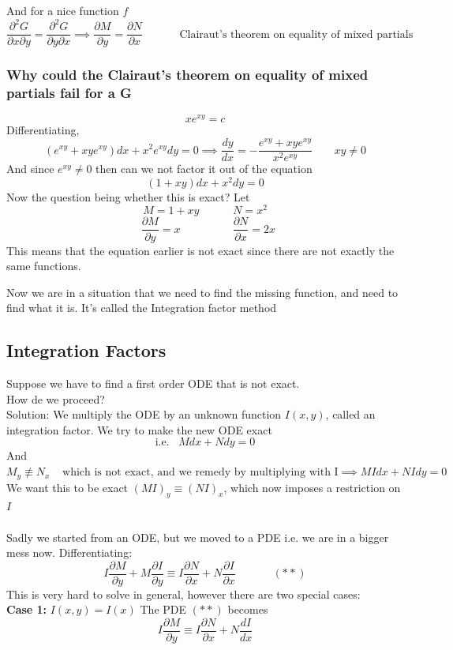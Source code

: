 \documentclass[11pt]{article}
\theoremstyle{definition}
\begin{document}
And for a nice function $f$
$$\frac{\partial^2G}{\partial x \partial y} = \frac{\partial^2G}{\partial y \partial x} \implies \frac{\partial M}{\partial y} = \frac{\partial N}{\partial x}\;\;\;\;\;\;\;\;\;\;\;\; \text{Clairaut's theorem on equality of mixed partials}$$

\subsubsection{Why could the Clairaut's theorem on equality of mixed partials fail for a G}
$$xe^{xy} = c$$
Differentiating,
$$(e^{xy}+xye^{xy})dx + x^2e^{xy}dy = 0 \implies \frac{dy}{dx} = -\frac{e^{xy} + xye^{xy}}{x^2e^{xy}} \;\;\;\;\;\;\; xy \neq 0$$
And since $e^{xy} \neq 0$ then can we not factor it out of the equation
$$(1+xy)dx + x^2dy = 0$$
Now the question being whether this is exact?
Let $$M = 1+xy\;\;\;\;\;\;\;\;\;\;\; N = x^2$$
$$\;\;\frac{\partial M}{\partial y} = x\;\;\;\;\;\;\;\;\;\;\;\;\;\;\;\;\; \frac{\partial N}{\partial x} = 2x$$
This means that the equation earlier is not exact since there are not exactly the same functions.

Now we are in a situation that we need to find the missing function, and need to find what it is. It's called the Integration factor method
\subsection{Integration Factors}
Suppose we have to find a first order ODE that is not exact.\\
How de we proceed?\\
Solution: We multiply the ODE by an unknown function $I(x,y)$, called an integration factor. We try to make the new ODE exact
$$\text{i.e.} \;\;\; Mdx + Ndy = 0$$
And $M_y \not\equiv N_x \;\;\;\; \text{which is not exact, and we remedy by multiplying with I} \implies MIdx + NIdy = 0$\\
We want this to be exact  $(MI)_y \equiv (NI)_x$, which now imposes a restriction on $I$\\\\
Sadly we started from an ODE, but we moved to a PDE i.e. we are in a bigger mess now. Differentiating:
$$I\frac{\partial M}{\partial y} + M\frac{\partial I}{\partial y} \equiv I\frac{\partial N}{\partial x} + N\frac{\partial I}{\partial x} \;\;\;\;\;\;\;\;\;\;\;\; (**)$$
This is very hard to solve in general, however there are two special cases:\\
\textbf{Case 1:}
$I(x,y) = I(x)$ The PDE $(**)$ becomes
$$I\frac{\partial M}{\partial y} \equiv I\frac{\partial N}{\partial x} + N\frac{dI}{dx}$$
\end{document}
